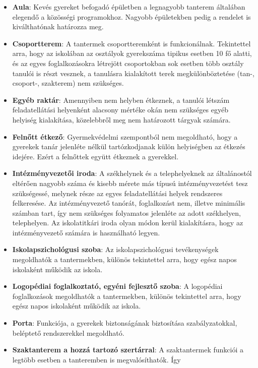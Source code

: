 \begin{itemize}
\item
  \textbf{Aula}: Kevés gyereket befogadó épületben a legnagyobb tanterem
  általában elegendő a közösségi programokhoz. Nagyobb épületekben pedig
  a rendelet is kiválthatónak határozza meg.
\item
  \textbf{Csoportterem}: A tantermek csoportteremként is funkcionálnak.\break
  Tekintettel arra, hogy az iskolában az osztályok gyerekszáma tipikus
  esetben 10 fő alatti, és az egyes foglalkozásokra létrejött
  csoportokban sok esetben több osztály tanulói is részt vesznek, a
  tanulásra kialakított terek megkülönböztetése (tan-, csoport-,
  szakterem) nem szükséges.
\item
  \textbf{Egyéb raktár}: Amennyiben nem helyben étkeznek, a tanulói
  létszám feladatellátási helyenként alacsony mértéke okán nem szükséges
  egyéb helyiség kialakítása, közelebbről meg nem határozott tárgyak
  számára.
\item
  \textbf{Felnőtt étkező}: Gyermekvédelmi szempontból nem megoldható,\break     
  hogy a gyerekek tanár jelenléte nélkül tartózkodjanak külön
  helyiségben az étkezés idejére. Ezért a felnőttek együtt étkeznek a
  gyerekkel.
\item
  \textbf{Intézményvezetői iroda}: A székhelynek és a telephelyeknek az
  általánostól eltérően nagyobb száma és kisebb mérete más típusú
  intézményvezetést tesz szükségessé, melynek része az egyes
  feladatellátási helyek rendszeres felkeresése. Az intézményvezető
  tanórát, foglalkozást nem, illetve minimális számban tart, így nem
  szükséges folyamatos jelenléte az adott székhelyen, telephelyen. Az
  iskolatitkári iroda olyan módon kerül kialakításra, hogy az
  intézményvezető számára is használható legyen.
\item
  \textbf{Iskolapszichológusi szoba}: Az iskolapszichológusi
  tevékenységek megoldhatók a tantermekben, különös tekintettel arra,
  hogy egész napos iskolaként működik az iskola.
\item
  \textbf{Logopédiai foglalkoztató, egyéni fejlesztő szoba}: A
  logopédiai foglalkozások megoldhatók a tantermekben, különös
  tekintettel arra, hogy egész napos iskolaként működik az iskola.
\item
  \textbf{Porta}: Funkciója, a gyerekek biztonságának biztosítása
  szabályzatokkal, beléptető rendszerekkel megoldható.
\item
  \textbf{Szaktanterem a hozzá tartozó szertárral}: A szaktantermek
  funkciói a legtöbb esetben a tanteremben is megvalósíthatók. Így

\end{itemize}
